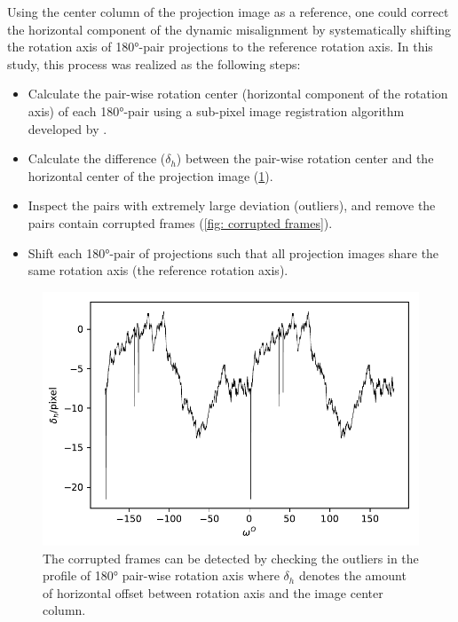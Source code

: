 \documentclass[12pt]{scrartcl}
\newcommand{\myscale}{1}
\begin{document}
Using the center column of the projection image as a reference, one could correct the horizontal component of the dynamic misalignment by systematically shifting the rotation axis of \ang{180}-pair projections to the reference rotation axis.
In this study, this process was realized as the following steps:
%
\begin{itemize}
\item 
Calculate the pair-wise rotation center (horizontal component of the rotation axis) of each \ang{180}-pair using a sub-pixel image registration algorithm developed by \citet{Guizar-Sicairos_etal2008}.
\item 
Calculate the difference ($\delta_h$) between the pair-wise rotation center and the horizontal center of the projection image (\cref{fig: corrupted frame detection}).
\item 
Inspect the pairs with extremely large deviation (outliers), and remove the pairs contain corrupted frames (\cref{fig: corrupted frames}).
\item
Shift each \ang{180}-pair of projections such that all projection images share the same rotation axis (the reference rotation axis).
\end{itemize}

\renewcommand{\myscale}{1}
\begin{figure}[htp]
\centering
\includegraphics[scale=\myscale]{corruptedFrameDetection}
\caption{
The corrupted frames can be detected by checking the outliers in the profile of \ang{180} pair-wise rotation axis where $\delta_h$ denotes the amount of horizontal offset between rotation axis and the image center column.
}\label{fig: corrupted frame detection}
\end{figure} 
\end{document}
